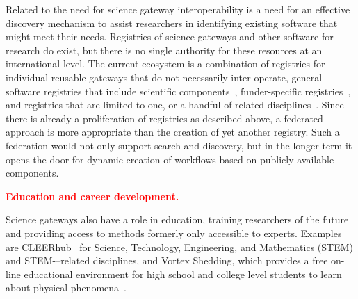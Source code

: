 \documentclass[review]{elsarticle}
\newcommand{\changedtext}[1]{
	\textcolor{red}{\textbf{#1}}
}
\begin{document}
Related to the need for science gateway interoperability is a need for an effective discovery mechanism to assist researchers in identifying existing software that might meet their needs. Registries of science gateways and other software for research do exist, but there is no single authority for these resources at an international level. The current ecosystem is a combination of registries for individual reusable gateways \cite{alces-54, hubzero-55} that do not necessarily inter-operate, general software registries that include scientific components~\cite{github-56,openhatch-57}, funder-specific registries~\cite{canarie-58}, and registries that are limited to one, or a handful of related disciplines~\cite{iplant-59,cyverse-60}. Since there is already a proliferation of registries as described above, a federated approach is more appropriate than the creation of yet another registry. Such a federation would not only support search and discovery, but in the longer term it opens the door for dynamic creation of workflows based on publicly available components.

\changedtext{\textbf{Education and career development.}}
Science gateways also have a role in education, training researchers of the future and providing access to methods formerly only accessible to experts. Examples are CLEERhub~\cite{cleerhub-74} for Science, Technology, Engineering, and Mathematics (STEM) and STEM-–related disciplines, and Vortex Shedding, which provides a free on-line educational environment for high school and college level students to learn about physical phenomena~\cite{vortex-75}.
\end{document}
